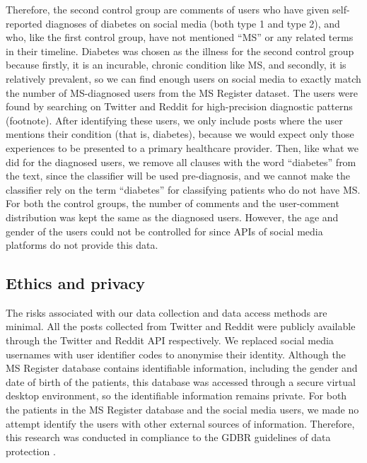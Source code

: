 \documentclass[11pt,a4paper]{article}
\begin{document}
\indent Therefore, the second control group are comments of users who have given self-reported diagnoses of diabetes on social media (both type 1 and type 2), and who, like the first control group, have not mentioned “MS” or any related terms in their timeline. Diabetes was chosen as the illness for the second control group because firstly, it is an incurable, chronic condition like MS, and secondly, it is relatively prevalent, so we can find enough users on social media to exactly match the number of MS-diagnosed users from the MS Register dataset. The users were found by searching on Twitter and Reddit for high-precision diagnostic patterns (footnote). After identifying these users, we only include posts where the user mentions their condition (that is, diabetes), because we would expect only those experiences to be presented to a primary healthcare provider. Then, like what we did for the diagnosed users, we remove all clauses with the word “diabetes” from the text, since the classifier will be used pre-diagnosis, and we cannot make the classifier rely on the term “diabetes” for classifying patients who do not have MS. \\
\indent For both the control groups, the number of comments and the user-comment distribution was kept the same as the diagnosed users. However, the age and gender of the users could not be controlled for since APIs of social media platforms do not provide this data.
\subsection{Ethics and privacy}
The risks associated with our data collection and data access methods are minimal. All the posts collected from Twitter and Reddit were publicly available through the Twitter and Reddit API respectively. We replaced social media usernames with user identifier codes to anonymise their identity. Although the MS Register database contains identifiable information, including the gender and date of birth of the patients, this database was accessed through a secure virtual desktop environment, so the identifiable information remains private. For both the patients in the MS Register database and the social media users, we made no attempt identify the users with other external sources of information. Therefore, this research was conducted in compliance to the GDBR guidelines of data protection \citep{GDBR:16}.
\end{document}
